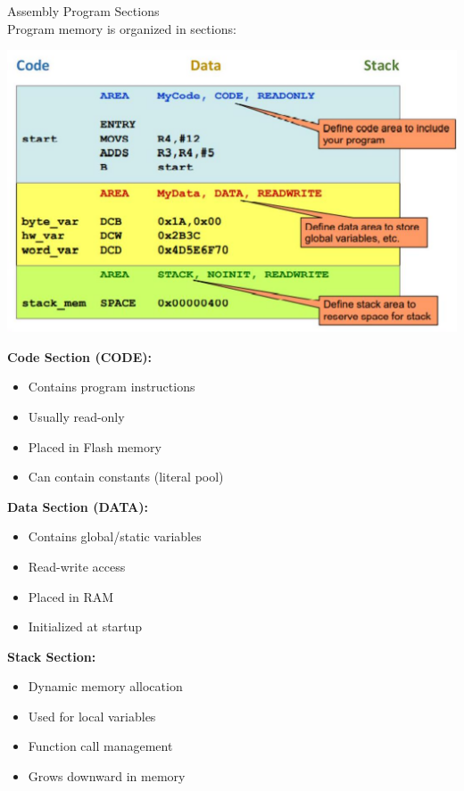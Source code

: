 \begin{concept}{Assembly Program Sections}\\
Program memory is organized in sections:

\includegraphics[width=\linewidth]{images/2024_12_29_79e6b22f503fb7b4f718g-02(1)}

\textbf{Code Section (CODE):}
\begin{itemize}
  \item Contains program instructions
  \item Usually read-only
  \item Placed in Flash memory
  \item Can contain constants (literal pool)
\end{itemize}

\textbf{Data Section (DATA):}
\begin{itemize}
  \item Contains global/static variables
  \item Read-write access
  \item Placed in RAM
  \item Initialized at startup
\end{itemize}

\textbf{Stack Section:}
\begin{itemize}
  \item Dynamic memory allocation
  \item Used for local variables
  \item Function call management
  \item Grows downward in memory
\end{itemize}
\end{concept}


